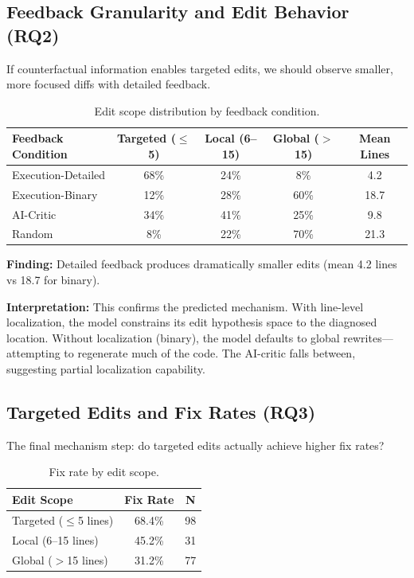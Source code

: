 \subsection{Feedback Granularity and Edit Behavior (RQ2)}

If counterfactual information enables targeted edits, we should observe smaller, more focused diffs with detailed feedback.

\begin{table}[h]
\centering
\caption{Edit scope distribution by feedback condition.}
\label{tab:editscope}
\begin{tabular}{lcccc}
\toprule
\textbf{Feedback Condition} & \textbf{Targeted ($\leq$5)} & \textbf{Local (6--15)} & \textbf{Global ($>$15)} & \textbf{Mean Lines} \\
\midrule
Execution-Detailed & 68\% & 24\% & 8\% & 4.2 \\
Execution-Binary & 12\% & 28\% & 60\% & 18.7 \\
AI-Critic & 34\% & 41\% & 25\% & 9.8 \\
Random & 8\% & 22\% & 70\% & 21.3 \\
\bottomrule
\end{tabular}
\end{table}

\textbf{Finding:} Detailed feedback produces dramatically smaller edits (mean 4.2 lines vs 18.7 for binary).

\textbf{Interpretation:} This confirms the predicted mechanism. With line-level localization, the model constrains its edit hypothesis space to the diagnosed location. Without localization (binary), the model defaults to global rewrites---attempting to regenerate much of the code. The AI-critic falls between, suggesting partial localization capability.

\subsection{Targeted Edits and Fix Rates (RQ3)}

The final mechanism step: do targeted edits actually achieve higher fix rates?

\begin{table}[h]
\centering
\caption{Fix rate by edit scope.}
\label{tab:fixrate}
\begin{tabular}{lcc}
\toprule
\textbf{Edit Scope} & \textbf{Fix Rate} & \textbf{N} \\
\midrule
Targeted ($\leq$5 lines) & 68.4\% & 98 \\
Local (6--15 lines) & 45.2\% & 31 \\
Global ($>$15 lines) & 31.2\% & 77 \\
\bottomrule
\end{tabular}
\end{table}

